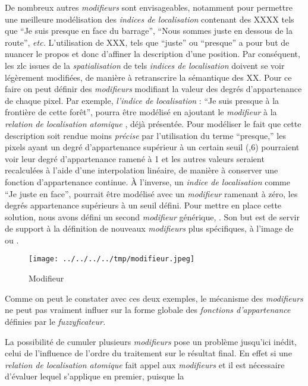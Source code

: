 De nombreux autres \emph{modifieurs} sont envisageables, notamment
pour permettre une meilleure modélisation des \emph{indices de
  localisation} contenant des XXXX tels que \enquote{Je suis presque
  en face du barrage}, \enquote{Nous sommes juste en dessous de la
  route}, \emph{etc.} L'utilisation de XXX, tels que \enquote{juste}
ou \enquote{presque} a pour but de nuancer le propos et donc d'affiner
la description d'une position. Par conséquent, les \ac{zlc} issues de
la \emph{spatialisation} de tels \emph{indices de localisation}
doivent se voir légèrement modifiées, de manière à retranscrire la
sémantique des XX. Pour ce faire on peut définir des \emph{modifieurs}
modifiant la valeur des degrés d'appartenance de chaque pixel. Par
exemple, \emph{l'indice de localisation} : \enquote{Je suis presque à
  la frontière de cette forêt}, pourra être modélisé en ajoutant le
\emph{modifieur} \onto[Presque] à la \emph{relation de localisation
  atomique} , déjà présentée. Pour
modéliser le fait que cette description soit rendue moins
\emph{précise} par l'utilisation du terme \enquote{presque,} les
pixels ayant un degré d'appartenance supérieur à un certain seuil (,6) pourraient voir leur degré d'appartenance ramené à 1 et les
autres valeurs seraient recalculées à l'aide d'une interpolation
linéaire, de manière à conserver une fonction d'appartenance
continue. À l'inverse, un \emph{indice de localisation} comme
\enquote{Je juste en face}, pourrait être modélisé avec un
\emph{modifieur} ramenant à zéro, les degrés appartenance supérieurs à
un seuil défini. Pour mettre en place cette solution, nous avons
défini un second \emph{modifieur} générique, . Son
but est de servir de support à la définition de nouveaux
\emph{modifieurs} plus spécifiques, à l'image de  ou
.

\begin{figure}
  \centering
  \texttt{[image: ../../../../tmp/modifieur.jpeg]}
  \caption{Modifieur}
  \label{fig:methode_modifieur}
\end{figure}

Comme on peut le constater avec ces deux exemples, le mécanisme des
\emph{modifieurs} ne peut pas vraiment influer sur la forme globale
des \emph{fonctions d'appartenance} définies par le \emph{fuzzyficateur.}

La possibilité de cumuler plusieurs \emph{modifieurs} pose un problème
jusqu'ici inédit, celui de l'influence de l'ordre du traitement sur le
résultat final. En effet si une \emph{relation de localisation
  atomique} fait appel aux \emph{modifieurs}  et
 il est nécessaire d'évaluer lequel s'applique en
premier, puisque la 

